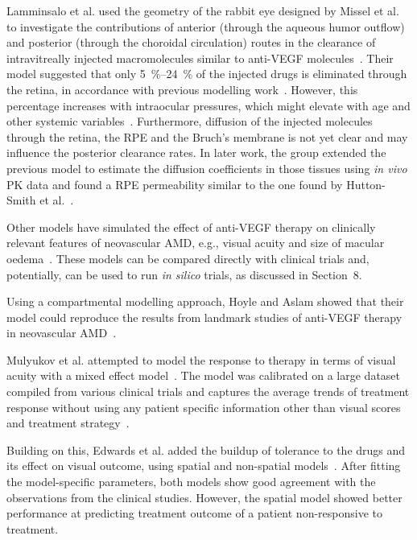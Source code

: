 \documentclass[12pt,a4paper]{journal}
\begin{document}
Lamminsalo et al. used the geometry of the rabbit eye designed by Missel et al. to investigate the contributions of anterior (through the aqueous humor outflow) and posterior (through the choroidal circulation) routes in the clearance of intravitreally injected macromolecules similar to anti-VEGF molecules~\cite{Lamminsalo_2018}.
Their model suggested that only \SIrange[range-units = single]{5}{24}{\percent} of the injected drugs is eliminated through the retina, in accordance with previous modelling work~\cite{HuttonSmith_2017}.
However, this percentage increases with intraocular pressures, which might elevate with age and other systemic variables~\cite{Armaly_1967,Hashemi_2005}.
Furthermore, diffusion of the injected molecules through the retina, the RPE and the Bruch's membrane is not yet clear and may influence the posterior clearance rates.
In later work, the group extended the previous model to estimate the diffusion coefficients in those tissues using \textit{in vivo} PK data and found a RPE permeability similar to the one found by Hutton-Smith et al.~\cite{Lamminsalo_2020,HuttonSmith_2017}.

Other models have simulated the effect of anti-VEGF therapy on clinically relevant features of neovascular AMD, e.g., visual acuity and size of macular oedema~\cite{Edwards_2020, Hoyle_2017, Mulyukov_2018}.
These models can be compared directly with clinical trials and, potentially, can be used to run \textit{in silico} trials, as discussed in Section~8. %

Using a compartmental modelling approach, Hoyle and Aslam showed that their model could reproduce the results from landmark studies of anti-VEGF therapy in neovascular AMD~\cite{Hoyle_2017}.

Mulyukov et al. attempted to model the response to therapy in terms of visual acuity with a mixed effect model~\cite{Mulyukov_2018}.
The model was calibrated on a large dataset compiled from various clinical trials and captures the average trends of treatment response without using any patient specific information other than visual scores and treatment strategy~\cite{Mulyukov_2018}.

Building on this, Edwards et al. added the buildup of tolerance to the drugs and its effect on visual outcome, using spatial and non-spatial models~\cite{Edwards_2020}.
After fitting the model-specific parameters, both models show good agreement with the observations from the clinical studies.
However, the spatial model showed better performance at predicting treatment outcome of a patient non-responsive to treatment.



\end{document}
